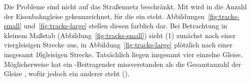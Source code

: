 \documentclass[../main/thesis.tex]{subfiles}
\begin{document}


\label{railway-case}

Die Probleme sind nicht auf das Straßennetz beschränkt.
Mit  wird in \osm{} die Anzahl der Eisenbahngleise gekennzeichnet, für die ein  steht.
Abbildungen~\ref{fig:tracks-small} und~\ref{fig:tracks-large} stellen diesen  farblich dar.
Bei Betrachtung in kleinem Maßstab (Abbildung~\ref{fig:tracks-small}) sieht (1) zunächst nach einer viergleisigen Strecke aus, in Abbildung~\ref{fig:tracks-large} plötzlich nach einer insgesamt 16gleisigen Strecke.
Tatsächlich liegen insgesamt vier einzelne Gleise.
Möglicherweise hat ein \osm-Beitragender  missverstanden als die Gesamtanzahl der Gleise , wofür jedoch ein anderer  steht ().
\end{document}
